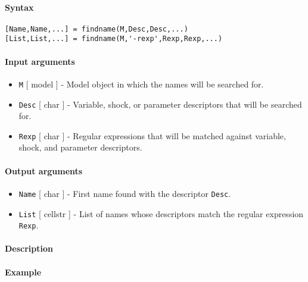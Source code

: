 


	\paragraph{Syntax}

\begin{verbatim}
[Name,Name,...] = findname(M,Desc,Desc,...)
[List,List,...] = findname(M,'-rexp',Rexp,Rexp,...)
\end{verbatim}

\paragraph{Input arguments}

\begin{itemize}
\item
  \texttt{M} {[} model {]} - Model object in which the names will be
  searched for.
\item
  \texttt{Desc} {[} char {]} - Variable, shock, or parameter descriptors
  that will be searched for.
\item
  \texttt{Rexp} {[} char {]} - Regular expressions that will be matched
  against variable, shock, and parameter descriptors.
\end{itemize}

\paragraph{Output arguments}

\begin{itemize}
\item
  \texttt{Name} {[} char {]} - First name found with the descriptor
  \texttt{Desc}.
\item
  \texttt{List} {[} cellstr {]} - List of names whose descriptors match
  the regular expression \texttt{Rexp}.
\end{itemize}

\paragraph{Description}

\paragraph{Example}


